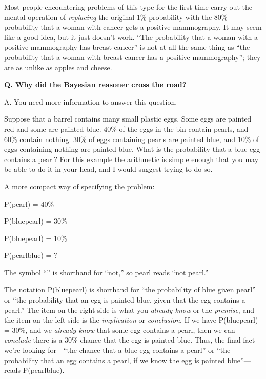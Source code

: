 {
 Most people encountering problems of this type for the first time
carry out the mental operation of \textit{replacing} the original 1\%
probability with the 80\% probability that a woman with cancer gets a
positive mammography. It may seem like a good idea, but it just
doesn't work. ``The probability that a
woman with a positive mammography has breast cancer''
is not at all the same thing as ``the probability that
a woman with breast cancer has a positive
mammography''; they are as unlike as apples and
cheese.}

{
 \textbf{Q. Why did the Bayesian reasoner cross the road?}}

{
 A. You need more information to answer this question.}

{
 Suppose that a barrel contains many small plastic eggs. Some eggs
are painted red and some are painted blue. 40\% of the eggs in the bin
contain pearls, and 60\% contain nothing. 30\% of eggs containing
pearls are painted blue, and 10\% of eggs containing nothing are
painted blue. What is the probability that a blue egg contains a pearl?
For this example the arithmetic is simple enough that you may be able
to do it in your head, and I would suggest trying to do so.}

{
 A more compact way of specifying the problem:}

{\centering
 P(pearl) = 40\%
\par}


\bigskip

{\centering
 P(blue{\textbar}pearl) = 30\%
\par}


\bigskip

{\centering
 P(blue{\textbar}{\textlnot}pearl) = 10\%
\par}


\bigskip

{\centering
 P(pearl{\textbar}blue) = ?
\par}


\bigskip

{
 The symbol ``{\textlnot}'' is
shorthand for ``not,'' so
{\textlnot}pearl reads ``not
pearl.''}

{
 The notation P(blue{\textbar}pearl) is shorthand for
``the probability of blue given
pearl'' or ``the probability that an
egg is painted blue, given that the egg contains a
pearl.'' The item on the right side is what you
\textit{already know} or the \textit{premise}, and the item on the left
side is the \textit{implication} or \textit{conclusion}. If we have
P(blue{\textbar}pearl) = 30\%, and we \textit{already know} that some
egg contains a pearl, then we can \textit{conclude} there is a 30\%
chance that the egg is painted blue. Thus, the final fact
we're looking for---``the chance that
a blue egg contains a pearl'' or
``the probability that an egg contains a pearl, if we
know the egg is painted blue''---reads
P(pearl{\textbar}blue).}

